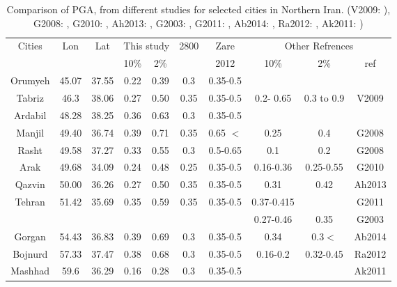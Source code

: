 \begin{table}[h]
\centering
\caption{Comparison of PGA, from different studies for selected cities in Northern Iran. (V2009:  \citet{vafaie2011}), G2008: \citet{Ghodrati2008}, G2010: \citet{Ghodrati2010},  Ah2013: \citet{Ahmadi2013}, G2003:  \citet{Ghodrati2003}, G2011: \citet{Ghodrati2011}, Ab2014: \citet{Abdollahzadeh2014} , Ra2012: \citet{Rahgozar2012} , Ak2011: \citet{Akbari2011} ) }
\begin{tabular}{ | c | c | c | c | c | c | c | c | c | c |}


\hline

	
	\multirow{2}{*}{Cities} & \multirow{2}{*}{Lon} & \multirow{2}{*}{Lat} & \multicolumn{2}{|c|}{This study} & \multirow{2}{*}{2800} & Zare & \multicolumn{3}{|c|}{Other Refrences}    \\ 
	\cline{4-5}  \cline{8-10}  &  &  & 10\% & 2\% &  &  2012 & 10\% & 2\% & ref \\ \hline
	Orumyeh & 45.07 & 37.55 & 0.22 & 0.39 & 0.3 & 0.35-0.5 &  &  &  \\ \hline
	Tabriz      & 46.3     & 38.06 & 0.27& 0.50 & 0.35 & 0.35-0.5 & 0.2- 0.65 & 0.3 to 0.9 & V2009 \\ \hline
	Ardabil    & 48.28 & 38.25 & 0.36 & 0.63 & 0.3 & 0.35-0.5 &  &  &  \\ \hline
	Manjil     & 49.40 & 36.74 & 0.39 & 0.71 & 0.35 & 0.65 $<$ & 0.25 & 0.4 & G2008 \\ \hline
	Rasht     & 49.58 & 37.27 & 0.33 & 0.55 & 0.3 & 0.5-0.65 & 0.1 & 0.2 & G2008 \\ \hline 
	Arak       & 49.68 & 34.09 & 0.24 & 0.48 & 0.25 & 0.35-0.5 & 0.16-0.36 & 0.25-0.55 & G2010 \\ \hline
	Qazvin   & 50.00 & 36.26 & 0.27 & 0.50 & 0.35 & 0.35-0.5 & 0.31 & 0.42 & Ah2013 \\ \hline
	 \multirow{2}{*}{Tehran}  & \multirow{2}{*}{51.42} & \multirow{2}{*}{35.69} & \multirow{2}{*}{0.35} & \multirow{2}{*}{0.59} & \multirow{2}{*}{0.35} & \multirow{2}{*}{0.35-0.5} & 0.37-0.415 &  &  G2011 \\ 
	 \cline{8-10}	             &  &  &  &  &  &  & 0.27-0.46 & 0.35 & G2003\\ \hline
	Gorgan & 54.43 & 36.83 & 0.39 & 0.69 & 0.3 & 0.35-0.5 & 0.34 & 0.3$<$ & Ab2014\\ \hline
	Bojnurd & 57.33 & 37.47 & 0.38 & 0.68 & 0.3 & 0.35-0.5 &0.16-0.2  & 0.32-0.45  & Ra2012  \\ \hline
	Mashhad & 59.6 & 36.29 & 0.16 & 0.28 & 0.3 & 0.35-0.5 &  &  & Ak2011 \\ \hline

\end{tabular}

\end{table}



